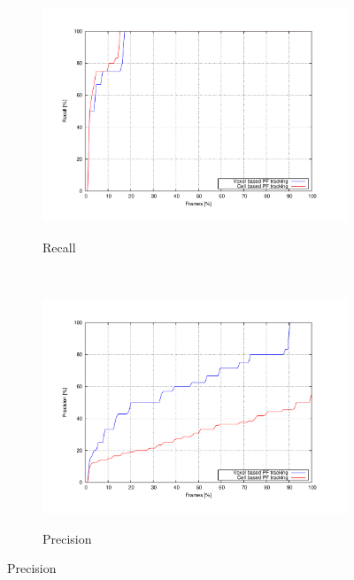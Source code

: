 \begin{figure}[h!]
        \centering
        \begin{subfigure}[b]{0.5\textwidth}
                \centering
                \includegraphics[width=\textwidth, trim=50 40 80 60,clip]{recall}\label{fig:cp05_recall}
                \caption{Recall}
                \label{fig:recallChart}
        \end{subfigure}%
        ~ %
        \begin{subfigure}[b]{0.5\textwidth}
                \centering
                \includegraphics[width=\textwidth, trim=50 40 80 60,clip]{precision}\label{fig:cp05_precision}
                \caption{Precision}
                \label{fig:precisionChart}
        \end{subfigure}%
        

\end{figure}
